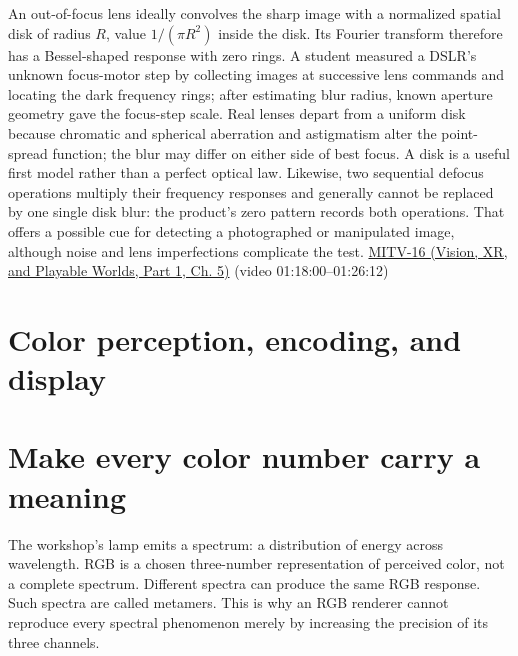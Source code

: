An out-of-focus lens ideally convolves the sharp image with a normalized spatial disk of radius \(R\), value \(1/(\pi R^2)\) inside the disk. Its Fourier transform therefore has a Bessel-shaped response with zero rings. A student measured a DSLR's unknown focus-motor step by collecting images at successive lens commands and locating the dark frequency rings; after estimating blur radius, known aperture geometry gave the focus-step scale. Real lenses depart from a uniform disk because chromatic and spherical aberration and astigmatism alter the point-spread function; the blur may differ on either side of best focus. A disk is a useful first model rather than a perfect optical law. Likewise, two sequential defocus operations multiply their frequency responses and generally cannot be replaced by one single disk blur: the product's zero pattern records both operations. That offers a possible cue for detecting a photographed or manipulated image, although noise and lens imperfections complicate the test. \href{../07-Vision-XR-and-Playable-Worlds-P01/main.pdf\#nameddest=04-visual-computing-ii-ch036-mitv-16---fast-convolution-low-pass-filter-approximations-integral-images-us-6457032}{MITV-16 (Vision, XR, and Playable Worlds, Part 1, Ch. 5)} (video 01:18:00--01:26:12)

\section{Color perception, encoding, and display}\label{03-visual-computing-i-ch004-color-perception-encoding-and-display}

\hypertarget{03-visual-computing-i-ch004-color-perception-encoding-and-display}{}

\section{Make every color number carry a meaning}\label{03-visual-computing-i-ch004-make-every-color-number-carry-a-meaning}

\hypertarget{03-visual-computing-i-ch004-make-every-color-number-carry-a-meaning}{}

The workshop's lamp emits a spectrum: a distribution of energy across wavelength. RGB is a chosen three-number representation of perceived color, not a complete spectrum. Different spectra can produce the same RGB response. Such spectra are called metamers. This is why an RGB renderer cannot reproduce every spectral phenomenon merely by increasing the precision of its three channels.

